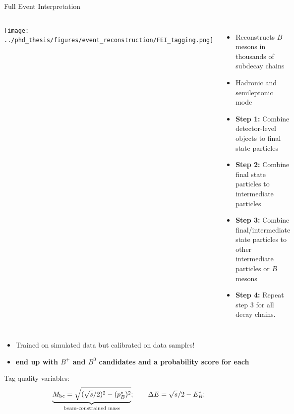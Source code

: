 \documentclass[xcolor=dvipsnames]{beamer}
\begin{document}
   \begin{frame}{Full Event Interpretation}
      \scriptsize\centering
   \begin{columns}
         \texttt{[image: ../phd\_thesis/figures/event\_reconstruction/FEI\_tagging.png]}
         \begin{itemize}
            \item Reconstructs $B$ mesons in thousands of subdecay chains
            \item Hadronic and semileptonic mode
            \item \textbf{Step 1:} Combine detector-level objects to final state particles
            \item \textbf{Step 2:} Combine final state particles to intermediate particles
            \item \textbf{Step 3:} Combine final/intermediate state particles to other intermediate particles or $B$ mesons
            \item \textbf{Step 4:} Repeat step 3 for all decay chains.
         \end{itemize}
      
   \end{columns}
\begin{itemize}
   \item Trained on simulated data but calibrated on data samples!
   \item[\ra]\textbf{end up with $B^+$ and $B^0$ candidates and a probability score \feiProb for each}
\end{itemize}   

\vspace{10pt}

Tag quality variables:
\vspace{-5pt}
\begin{equation*}
   \underbrace{{M_{\mathrm{bc}}} = \sqrt{(\sqrt{s}/2)^2 - (p^*_B)^2}}_{\text{beam-constrained mass}}; \quad\quad \Delta E = \sqrt{s}/2 - E_{B}^*;
\end{equation*}


\end{frame}
\end{document}
